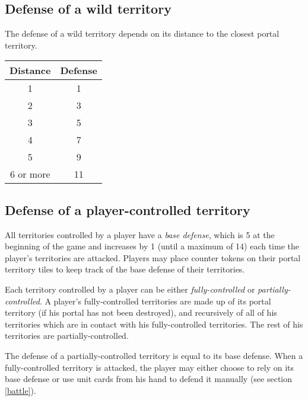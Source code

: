 \documentclass[a4paper]{article}
\begin{document}
    \subsection{Defense of a wild territory}
        The defense of a wild territory depends on its distance
        to the closest portal territory.
        \begin{table}[h]
        \centering
        \begin{tabular}{|c|c|}
             \hline
                  Distance & Defense \\
              \hline
                  1 & 1 \\
                  2 & 3 \\
                  3 & 5 \\
                  4 & 7 \\
                  5 & 9 \\
                  6 or more & 11 \\
              \hline
        \end{tabular}
        \end{table}
        
        
    \subsection{Defense of a player-controlled territory}
        \label{base-defense}
        All territories controlled by a player have a \textit{base defense},
        which is 5 at the beginning of the game and increases by 1
        (until a maximum of 14)
        each time the player's territories are attacked.
        Players may place counter tokens on their portal territory tiles to keep
        track of the base defense of their territories.
        
        Each territory controlled by a player can be either \textit{fully-controlled}
        or \textit{partially-controlled}.
        A player's fully-controlled territories are made up of its portal territory
        (if his portal has not been destroyed), and recursively of all of his territories
        which are in contact with his fully-controlled territories.
        The rest of his territories are partially-controlled.
        
        The defense of a partially-controlled territory is equal to its base defense.
        When a fully-controlled territory is attacked,
        the player may either choose to rely on its base defense
        or use unit cards from his hand to defend it manually (see section \ref{battle}).
        
\end{document}
